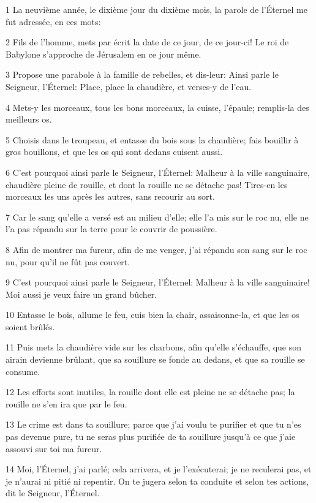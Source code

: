 \par 1 La neuvième année, le dixième jour du dixième mois, la parole de l'Éternel me fut adressée, en ces mots:
\par 2 Fils de l'homme, mets par écrit la date de ce jour, de ce jour-ci! Le roi de Babylone s'approche de Jérusalem en ce jour même.
\par 3 Propose une parabole à la famille de rebelles, et dis-leur: Ainsi parle le Seigneur, l'Éternel: Place, place la chaudière, et verses-y de l'eau.
\par 4 Mets-y les morceaux, tous les bons morceaux, la cuisse, l'épaule; remplis-la des meilleurs os.
\par 5 Choisis dans le troupeau, et entasse du bois sous la chaudière; fais bouillir à gros bouillons, et que les os qui sont dedans cuisent aussi.
\par 6 C'est pourquoi ainsi parle le Seigneur, l'Éternel: Malheur à la ville sanguinaire, chaudière pleine de rouille, et dont la rouille ne se détache pas! Tires-en les morceaux les uns après les autres, sans recourir au sort.
\par 7 Car le sang qu'elle a versé est au milieu d'elle; elle l'a mis sur le roc nu, elle ne l'a pas répandu sur la terre pour le couvrir de poussière.
\par 8 Afin de montrer ma fureur, afin de me venger, j'ai répandu son sang sur le roc nu, pour qu'il ne fût pas couvert.
\par 9 C'est pourquoi ainsi parle le Seigneur, l'Éternel: Malheur à la ville sanguinaire! Moi aussi je veux faire un grand bûcher.
\par 10 Entasse le bois, allume le feu, cuis bien la chair, assaisonne-la, et que les os soient brûlés.
\par 11 Puis mets la chaudière vide sur les charbons, afin qu'elle s'échauffe, que son airain devienne brûlant, que sa souillure se fonde au dedans, et que sa rouille se consume.
\par 12 Les efforts sont inutiles, la rouille dont elle est pleine ne se détache pas; la rouille ne s'en ira que par le feu.
\par 13 Le crime est dans ta souillure; parce que j'ai voulu te purifier et que tu n'es pas devenue pure, tu ne seras plus purifiée de ta souillure jusqu'à ce que j'aie assouvi sur toi ma fureur.
\par 14 Moi, l'Éternel, j'ai parlé; cela arrivera, et je l'exécuterai; je ne reculerai pas, et je n'aurai ni pitié ni repentir. On te jugera selon ta conduite et selon tes actions, dit le Seigneur, l'Éternel.
